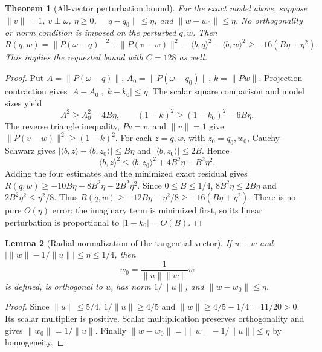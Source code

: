 \documentclass[11pt]{article}
\newtheorem{theorem}{Theorem}[section]
\newtheorem{lemma}[theorem]{Lemma}
\theoremstyle{definition}
\theoremstyle{remark}
\numberwithin{equation}{section}
\begin{document}
\begin{theorem}[All-vector perturbation bound]\label{geometry-perturb:residual}
For the exact model above, suppose $\|v\|=1$, $v\perp\omega$,
$\eta\ge0$, $\|q-q_0\|\le\eta$, and $\|w-w_0\|\le\eta$.
No orthogonality or norm condition is imposed on the perturbed $q,w$.
Then
\[
 R(q,w)=\|P(\omega-q)\|^2+\|P(v-w)\|^2
          -\langle b,q\rangle^2-\langle b,w\rangle^2
 \ge-16(B\eta+\eta^2).
\]
This implies the requested bound with $C=128$ as well.
\end{theorem}
\begin{proof}
Put $A=\|P(\omega-q)\|$, $A_0=\|P(\omega-q_0)\|$,
$k=\|Pw\|$. Projection contraction gives $|A-A_0|,|k-k_0|\le\eta$.
The scalar square comparison and model sizes yield
\[
 A^2\ge A_0^2-4B\eta,\qquad
 (1-k)^2\ge(1-k_0)^2-6B\eta.
\]
The reverse triangle inequality, $Pv=v$, and $\|v\|=1$ give
$\|P(v-w)\|^2\ge(1-k)^2$. For each $z=q,w$, with $z_0=q_0,w_0$,
Cauchy--Schwarz gives
$|\langle b,z\rangle-\langle b,z_0\rangle|\le B\eta$ and
$|\langle b,z_0\rangle|\le2B$. Hence
\[
 \langle b,z\rangle^2\le\langle b,z_0\rangle^2
                                  +4B^2\eta+B^2\eta^2.
\]
Adding the four estimates and the minimized exact residual gives
$R(q,w)\ge-10B\eta-8B^2\eta-2B^2\eta^2$.
Since $0\le B\le1/4$, $8B^2\eta\le2B\eta$ and
$2B^2\eta^2\le\eta^2/8$. Thus
$R(q,w)\ge-12B\eta-\eta^2/8\ge-16(B\eta+\eta^2)$.
There is no pure $O(\eta)$ error: the imaginary term is minimized first,
so its linear perturbation is proportional to $|1-k_0|=O(B)$.
\end{proof}

\begin{lemma}[Radial normalization of the tangential vector]\label{geometry-perturb:normalization}
If $u\perp w$ and
$|\|w\|-1/\|u\||\le\eta\le1/4$, then
\[
 w_0=\frac{1}{\|u\|\|w\|}w
\]
is defined, is orthogonal to $u$, has norm $1/\|u\|$, and
$\|w-w_0\|\le\eta$.
\end{lemma}
\begin{proof}
Since $\|u\|\le5/4$, $1/\|u\|\ge4/5$ and
$\|w\|\ge4/5-1/4=11/20>0$. Its scalar multiplier is positive.
Scalar multiplication preserves orthogonality and gives
$\|w_0\|=1/\|u\|$. Finally
$\|w-w_0\|=|\|w\|-1/\|u\||\le\eta$ by homogeneity.
\end{proof}
\end{document}
